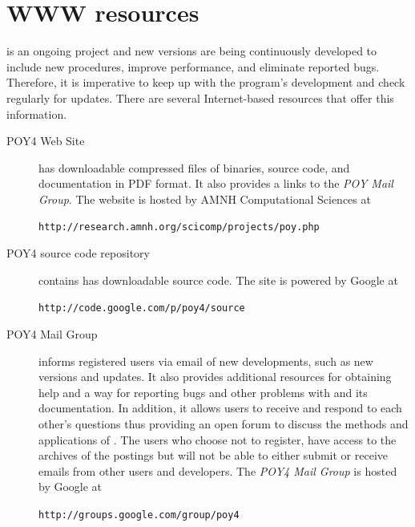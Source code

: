 \section{WWW resources}
\poy is an ongoing project and new versions are being continuously developed to include new procedures, improve performance, and eliminate reported bugs. Therefore, it is imperative to keep up with the program's development and check regularly for updates. There are several Internet-based resources that offer this information.

\begin{description}
\item[POY4 Web Site] has downloadable compressed files of \poy binaries, source code, and documentation in PDF format. It also provides a links to the \emph{POY Mail Group}. The website is hosted by AMNH Computational Sciences at 
\begin{center}
\texttt{http://research.amnh.org/scicomp/projects/poy.php}
\end{center}

\item[POY4 source code repository] contains has downloadable \poy source code.  The site is powered by Google at 
\begin{center}
\texttt{http://code.google.com/p/poy4/source}
\end{center}

\item[POY4 Mail Group] informs registered users via email of new developments, such as new versions and updates. It also provides  additional resources for obtaining help and a way for reporting bugs and other problems with \poy and its documentation. In addition, it allows users to receive and respond to each other's questions thus providing an open forum to  discuss the methods and applications of \poy. The users who choose not to register, have access to the archives of the postings but will not be able to either submit or receive emails from other users and \poy developers. The \emph{POY4 Mail Group} is hosted  by Google at
	\begin{center}
	\texttt{http://groups.google.com/group/poy4}
	\end{center}
	
\end{description}

